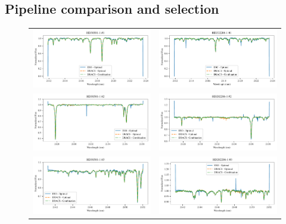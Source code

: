 \subsection{Pipeline comparison and selection}
\label{subsec:pipeline-selection}
\begin{figure}
    \begin{tabular}{cc}
        \includegraphics[width=0.47\linewidth]{figures/reduction/pipeline_compare/pipeline_compare_HD30501-1_chip_1} & \includegraphics[width=0.47\linewidth]{figures/reduction/pipeline_compare/pipeline_compare_HD202206-1_chip_1}\\
        \includegraphics[width=0.47\linewidth]{figures/reduction/pipeline_compare/pipeline_compare_HD30501-1_chip_2} & \includegraphics[width=0.47\linewidth]{figures/reduction/pipeline_compare/pipeline_compare_HD202206-1_chip_2}\\
        \includegraphics[width=0.47\linewidth]{figures/reduction/pipeline_compare/pipeline_compare_HD30501-1_chip_3} & \includegraphics[width=0.47\linewidth]{figures/reduction/pipeline_compare/pipeline_compare_HD202206-1_chip_3}\\

\end{tabular}
\end{figure}
